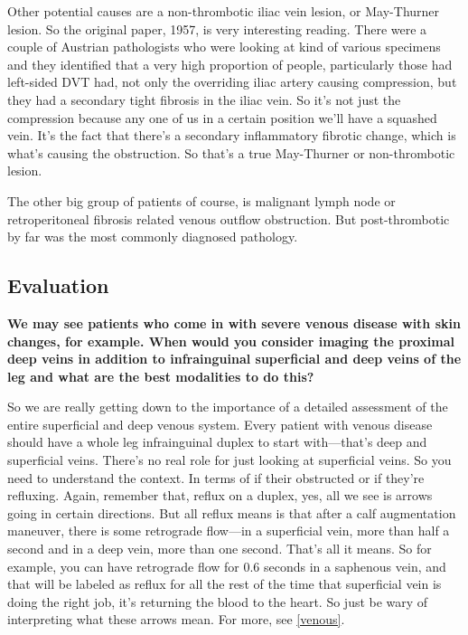 \documentclass[
]{book}
\begin{document}
Other potential causes are a non-thrombotic iliac vein lesion, or
May-Thurner lesion. So the original paper, 1957, is very interesting
reading.\citep{may1957} There were a couple of Austrian pathologists who were
looking at kind of various specimens and they identified that a very
high proportion of people, particularly those had left-sided DVT had,
not only the overriding iliac artery causing compression, but they had a
secondary tight fibrosis in the iliac vein. So it's not just the
compression because any one of us in a certain position we'll have a
squashed vein. It's the fact that there's a secondary inflammatory
fibrotic change, which is what's causing the obstruction. So that's a
true May-Thurner or non-thrombotic lesion.

The other big group of patients of course, is malignant lymph node or
retroperitoneal fibrosis related venous outflow obstruction. But
post-thrombotic by far was the most commonly diagnosed pathology.

\hypertarget{evaluation-19}{%
\subsection{Evaluation}\label{evaluation-19}}

\textbf{We may see patients who come in with severe venous disease with skin
changes, for example. When would you consider imaging the proximal deep
veins in addition to infrainguinal superficial and deep veins of the leg
and what are the best modalities to do this?}

So we are really getting down to the importance of a detailed assessment
of the entire superficial and deep venous system. Every patient with
venous disease should have a whole leg infrainguinal duplex to start
with---that's deep and superficial veins. There's no real role for just
looking at superficial veins. So you need to understand the context. In
terms of if their obstructed or if they're refluxing. Again, remember
that, reflux on a duplex, yes, all we see is arrows going in certain
directions. But all reflux means is that after a calf augmentation
maneuver, there is some retrograde flow---in a superficial vein, more
than half a second and in a deep vein, more than one second. That's all
it means. So for example, you can have retrograde flow for 0.6 seconds
in a saphenous vein, and that will be labeled as reflux for all the rest
of the time that superficial vein is doing the right job, it's returning
the blood to the heart. So just be wary of interpreting what these
arrows mean. For more, see \ref{venous}.
\end{document}

